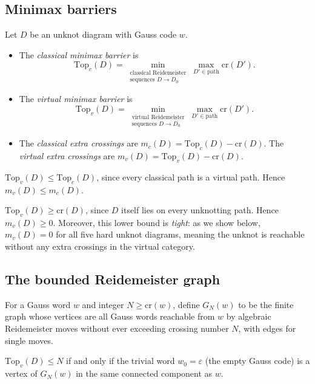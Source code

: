 \documentclass[a4paper,UKenglish,cleveref,autoref]{lipics-v2021}
\begin{document}
\subsection{Minimax barriers}

\begin{definition}
Let $D$ be an unknot diagram with Gauss code $w$.
\begin{itemize}
\item The \emph{classical minimax barrier} is
\[
\mathrm{Top}_c(D) = \min_{\substack{\text{classical Reidemeister} \\ \text{sequences } D \to D_0}} \max_{D' \in \text{path}} \mathrm{cr}(D').
\]
\item The \emph{virtual minimax barrier} is
\[
\mathrm{Top}_v(D) = \min_{\substack{\text{virtual Reidemeister} \\ \text{sequences } D \to D_0}} \max_{D' \in \text{path}} \mathrm{cr}(D').
\]
\item The \emph{classical extra crossings} are $m_c(D) = \mathrm{Top}_c(D) - \mathrm{cr}(D)$.
The \emph{virtual extra crossings} are $m_v(D) = \mathrm{Top}_v(D) - \mathrm{cr}(D)$.
\end{itemize}
\end{definition}

\begin{observation}
$\mathrm{Top}_v(D) \leq \mathrm{Top}_c(D)$, since every classical path is a virtual path.
Hence $m_v(D) \leq m_c(D)$.
\end{observation}

\begin{observation}
$\mathrm{Top}_v(D) \geq \mathrm{cr}(D)$, since $D$ itself lies on every unknotting path.
Hence $m_v(D) \geq 0$.
Moreover, this lower bound is \emph{tight}: as we show below, $m_v(D) = 0$ for all five hard unknot diagrams, meaning the unknot is reachable without any extra crossings in the virtual category.
\end{observation}

\subsection{The bounded Reidemeister graph}

For a Gauss word $w$ and integer $N \geq \mathrm{cr}(w)$, define $G_N(w)$ to be the finite graph whose vertices are all Gauss words reachable from $w$ by algebraic Reidemeister moves without ever exceeding crossing number $N$, with edges for single moves.

\begin{observation}
$\mathrm{Top}_v(D) \leq N$ if and only if the trivial word $w_0 = \varepsilon$ (the empty Gauss code) is a vertex of $G_N(w)$ in the same connected component as $w$.
\end{observation}
\end{document}
